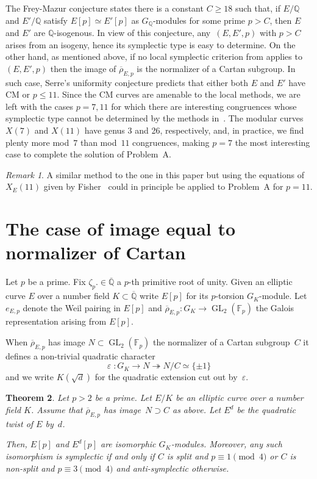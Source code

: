 \documentclass[12pt]{amsart}
\newcommand{\F}{\mathbb{F}}
\newcommand{\Q}{\mathbb{Q}}
\newcommand{\Qbar}{{\overline{\Q}}}
\newcommand{\rhobar}{{\overline{\rho}}}
\newcommand{\eps}{\varepsilon}
\newcommand{\GL}{\operatorname{GL}}
\numberwithin{equation}{section}
\newtheorem{theorem}{Theorem}[section]
\theoremstyle{definition}
\theoremstyle{remark}
\newtheorem{remark}[theorem]{Remark}
\begin{document}
The Frey-Mazur conjecture states there is a constant $C \geq 18$ such that, if $E/\Q$ and $E'/\Q$ satisfy $E[p] \simeq E'[p]$ as $G_\Q$-modules for some prime $p > C$, then $E$ and $E'$ are $\Q$-isogenous. In view of this conjecture, any~$(E,E',p)$ with $p > C$ arises from an isogeny, hence its symplectic type is easy 
to determine. On the other hand, as mentioned above, if no local symplectic criterion from \cite{FKSym} applies to~$(E,E',p)$
then the image of $\rhobar_{E,p}$ is the normalizer of a Cartan subgroup. In such case, Serre's uniformity conjecture predicts that either both $E$ and $E'$ have CM or $p \le 11$.
Since the CM curves are amenable to the local methods, 
we are left with the cases $p=7,11$ for which there are interesting congruences whose symplectic type cannot be determined by the methods in~\cite{FKSym}. 
The modular curves $X(7)$ and $X(11)$ have genus 3 and 26, respectively, and, in practice, we find plenty more mod~$7$ than mod~$11$ congruences, making $p=7$ the most interesting case to complete the solution of Problem~A. 


\begin{remark}
A similar method to the one in this paper but using the equations of $X_E(11)$ given by Fisher~\cite{Fisher} 
could in principle be applied to Problem~A for $p=11$. 
\end{remark}

\section{The case of image equal to normalizer of Cartan}

Let $p$ be a prime. Fix $\zeta_p. \in \Qbar$ a $p$-th primitive root of unity.
Given an elliptic curve $E$ over a number field $K \subset \Qbar$ 
write $E[p]$ for its $p$-torsion $G_K$-module. Let $e_{E,p}$ denote 
the Weil pairing in $E[p]$
and $\rhobar_{E,p} : G_K \to \GL_2(\F_p)$ the Galois representation
arising from $E[p]$.

When $\rhobar_{E,p}$ has image $N \subset \GL_2(\F_p)$ the 
normalizer of a Cartan subgroup~$C$ it defines a non-trivial 
quadratic character
\[
 \eps \; : G_K \to N \twoheadrightarrow N/C \simeq \{\pm 1 \}
\]
and we write $K(\sqrt{d})$ for the quadratic extension cut 
out by~$\eps$.

\begin{theorem} Let $p > 2$ be a prime. Let $E/K$ be an elliptic curve 
over a number field $K$. Assume that $\rhobar_{E,p}$ has image~$N \supset C$ 
as above. Let $E^d$ be the quadratic twist of $E$ by~$d$.

Then, $E[p]$ and $E^d[p]$ are isomorphic $G_K$-modules. Moreover, 
any such isomorphism is symplectic if and only if $C$ is split and $p \equiv 1 \pmod{4}$ or 
$C$ is non-split and $p \equiv 3 \pmod{4}$ and anti-symplectic 
otherwise. 
\end{theorem}
\end{document}
